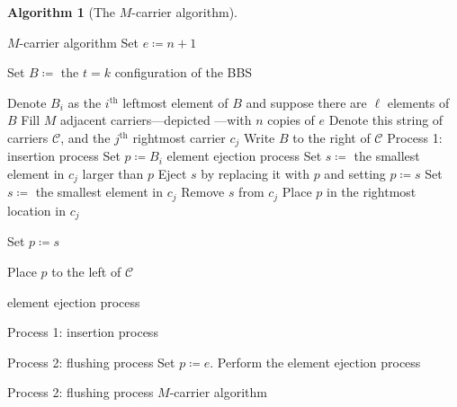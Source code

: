 \documentclass[submission]{FPSAC2021}
\theoremstyle{plain}
\theoremstyle{definition}
\newtheorem{algo}[theorem]{Algorithm}
\numberwithin{equation}{section}
\renewcommand{\th}{$^\text{th}$ }
\newcommand{\splitAlg}[1]{\algstore{#1}
\end{algorithmic}
\end{algorithm}
\begin{algorithm}[H]
\begin{algorithmic}[1]
\algrestore{#1}}
\begin{document}
\newpage
\begin{algo}[The $M$-carrier algorithm]\label{Alg: M-carrier}\phantom{ \dots }
\vspace{-.6em}
\begin{algorithm}[H]
\begin{algorithmic}[1]
\Begin $M$-carrier algorithm
\State Set $e\coloneqq n+1$
\State\parbox[t]{\dimexpr\linewidth-\algorithmicindent}{Set $B\coloneqq$ the $t=k$ configuration of the BBS
}
\State Denote $B_i$ as the $i$\th leftmost element of $B$ and suppose there are $\ell$ elements of $B$
\State Fill $M$ adjacent carriers---depicted \raisebox{.5em}{$\underbracket{\phantom{ \dots  \dots }}$}---with $n$ copies of $e$
\State Denote this string of carriers $\mathcal{C}$, and the $j$\th rightmost carrier $c_j$
\State Write $B$ to the right of $\mathcal{C}$
\Begin Process 1: insertion process
\State Set $p\coloneqq B_i$
\Begin element ejection process
\State Set $s\coloneqq$ the smallest element in $c_j$ larger than $p$
\State Eject $s$ by replacing it with $p$ and setting $p\coloneqq s$
\Else
\State Set $s\coloneqq$ the smallest element in $c_j$
\State Remove $s$ from $c_j$
\State Place $p$ in the rightmost location in $c_j$


\State Set $p\coloneqq s$
\EndIf


\State Place $p$ to the left of $\mathcal{C}$

\EndIf

\EndFor
\End element ejection process
\EndFor

\End Process 1: insertion process

\Begin Process 2: flushing process
\State Set $p\coloneqq e$.  Perform the element ejection process

\EndWhile
\End Process 2: flushing process
\End $M$-carrier algorithm\vspace{-1em}
\end{algorithmic}
\end{algorithm}
\end{algo}
\end{document}
